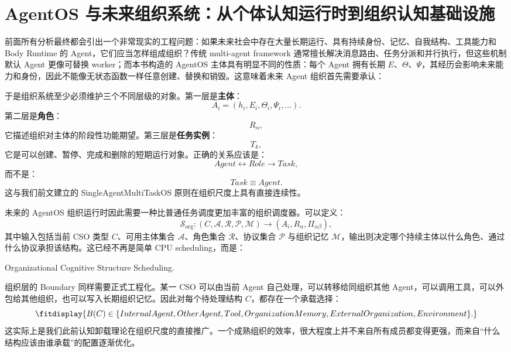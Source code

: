 \section{AgentOS 与未来组织系统：从个体认知运行时到组织认知基础设施}
\label{sec:agentos-organizational-system}

前面所有分析最终都会引出一个非常现实的工程问题：如果未来社会中存在大量长期运行、具有持续身份、记忆、自我结构、工具能力和 Body Runtime 的 Agent，它们应当怎样组成组织？传统 multi-agent framework 通常擅长解决消息路由、任务分派和并行执行，但这些机制默认 Agent 更像可替换 worker；而本书构造的 AgentOS 主体具有明显不同的性质：每个 Agent 拥有长期 $E$、$\Theta$、$\Psi$，其经历会影响未来能力和身份，因此不能像无状态函数一样任意创建、替换和销毁。这意味着未来 Agent 组织首先需要承认：
\begin{statementbox}
\centering
{}
\end{statementbox}

于是组织系统至少必须维护三个不同层级的对象。第一层是\textbf{主体}：
\[
A_i=
(h_i,E_i,\Theta_i,\Psi_i,\ldots).
\]
第二层是\textbf{角色}：
\[
R_\alpha,
\]
它描述组织对主体的阶段性功能期望。第三层是\textbf{任务实例}：
\[
T_k,
\]
它是可以创建、暂停、完成和删除的短期运行对象。正确的关系应该是：
\[
Agent
\longleftrightarrow
Role
\longrightarrow
Task,
\]
而不是：
\[
Task\equiv Agent.
\]
这与我们前文建立的 SingleAgentMultiTaskOS 原则在组织尺度上具有直接连续性。

未来的 AgentOS 组织运行时因此需要一种比普通任务调度更加丰富的组织调度器。可以定义：
\[
\mathcal S_{\mathrm{org}}
:
(
C,
\mathcal A,
\mathcal R,
\mathcal P,
\mathcal M
)
\rightarrow
(A_i,R_\alpha,\Pi_{\alpha\beta}),
\]
其中输入包括当前 CSO 类型 $C$、可用主体集合 $\mathcal A$、角色集合 $\mathcal R$、协议集合 $\mathcal P$ 与组织记忆 $\mathcal M$，输出则决定哪个持续主体以什么角色、通过什么协议承担该结构。这已经不再是简单 CPU scheduling，而是：
\begin{statementbox}
Organizational Cognitive Structure Scheduling.
\end{statementbox}

组织层的 Boundary 同样需要正式工程化。某一 CSO 可以由当前 Agent 自己处理，可以转移给同组织其他 Agent，可以调用工具，可以外包给其他组织，也可以写入长期组织记忆。因此对每个待处理结构 $C$，都存在一个承载选择：
\[
\fitdisplay{
B(C)
\in
\{
InternalAgent,
OtherAgent,
Tool,
OrganizationMemory,
ExternalOrganization,
Environment
\}.
}
\]
这实际上是我们此前认知卸载理论在组织尺度的直接推广。一个成熟组织的效率，很大程度上并不来自所有成员都变得更强，而来自“什么结构应该由谁承载”的配置逐渐优化。

